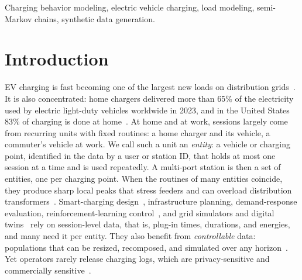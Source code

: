 \documentclass[journal]{IEEEtran}
\begin{document}
\begin{IEEEkeywords}
Charging behavior modeling, electric vehicle charging, load modeling, semi-Markov chains, synthetic data generation.
\end{IEEEkeywords}

\section{Introduction}
\label{sec:introduction}


EV charging is fast becoming one of the largest new loads on distribution grids~\cite{li2024impact}. It is also concentrated: home chargers delivered more than 65\% of the electricity used by electric light-duty vehicles worldwide in 2023, and in the United States 83\% of charging is done at home~\cite{iea2024}. At home and at work, sessions largely come from recurring units with fixed routines: a home charger and its vehicle, a commuter's vehicle at work. We call such a unit an \emph{entity}: a vehicle or charging point, identified in the data by a user or station ID, that holds at most one session at a time and is used repeatedly. A multi-port station is then a set of entities, one per charging point. When the routines of many entities coincide, they produce sharp local peaks that stress feeders and can overload distribution transformers~\cite{li2024impact}. Smart-charging design~\cite{sastry2023decentralized}, infrastructure planning, demand-response evaluation, reinforcement-learning control~\cite{xing2023bilevel}, and grid simulators and digital twins~\cite{yu2024digital} rely on session-level data, that is, plug-in times, durations, and energies, and many need it per entity. They also benefit from \emph{controllable} data: populations that can be resized, recomposed, and simulated over any horizon~\cite{powell2022}. Yet operators rarely release charging logs, which are privacy-sensitive and commercially sensitive~\cite{calearo2021, li2025trc}.


\end{document}
